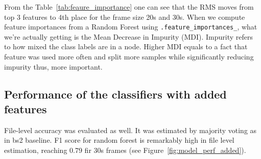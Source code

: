 \documentclass[conference]{IEEEtran}
\begin{document}
From the Table~\ref{tab:feaure_importance} one can see that the RMS moves from top 3 features to 4th place for the frame size 20s and 30s.
When we compute feature importances from a Random Forest using \texttt{.feature\_importances\_}, what we're actually getting is the Mean Decrease in Impurity (MDI). 
Impurity refers to how mixed the class labels are in a node.
Higher MDI equals to a fact that feature was used more often and split more samples while significantly reducing impurity thus, 
more important.


\subsection{Performance of the classifiers with added features}


\begin{table}[h]
\centering
\caption{Linear model performance with added features.}
\label{tab:linear_model_added_feat_perf}
\end{table}


File-level accuracy was evaluated as well. It was estimated by majority voting as in bs2 baseline.
F1 score for random forest is remarkably high in file level estimation, reaching 0.79 fir 30s frames (see Figure~\ref{fig:model_perf_added}).
\end{document}
